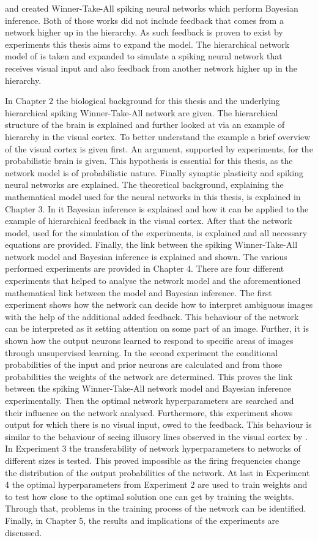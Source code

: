 \citet{nessler} and \citet{nesslerClone} created Winner-Take-All spiking neural networks which perform Bayesian inference. Both of those works did not include feedback that comes from a network higher up in the hierarchy. As such feedback is proven to exist by experiments this thesis aims to expand the model. The hierarchical network model of \citet{nessler} is taken and expanded to simulate a spiking neural network that receives visual input and also feedback from another network higher up in the hierarchy.

In Chapter 2 the biological background for this thesis and the underlying hierarchical spiking Winner-Take-All network are given. The hierarchical structure of the brain is explained and further looked at via an example of hierarchy in the visual cortex. To better understand the example a brief overview of the visual cortex is given first. An argument, supported by experiments, for the probabilistic brain is given. This hypothesis is essential for this thesis, as the network model is of probabilistic nature. Finally synaptic plasticity and spiking neural networks are explained.
The theoretical background, explaining the mathematical model used for the neural networks in this thesis, is explained in Chapter 3. In it Bayesian inference is  explained and how it can be applied to the example of hierarchical feedback in the visual cortex. After that the network model, used for the simulation of the experiments, is explained and all necessary equations are provided. Finally, the link between the spiking Winner-Take-All network model and Bayesian inference is  explained and shown.
The various performed experiments are provided in Chapter 4. There are four different experiments that helped to analyse the network model and the aforementioned mathematical link between the model and Bayesian inference. The first experiment shows how the network can decide how to interpret ambiguous images with the help of the additional added feedback. This behaviour of the network can be interpreted as it setting attention on some part of an image. Further, it is shown how the output neurons learned to respond to specific areas of images through unsupervised learning. In the second experiment the conditional probabilities of the input and prior neurons are calculated and from those probabilities the weights of the network are determined. This proves the link between the spiking Winner-Take-All network model and Bayesian inference experimentally. Then the optimal network hyperparameters are searched and their influence on the network analysed. Furthermore, this experiment shows output for which there is no visual input, owed to the feedback. This behaviour is similar to the behaviour of seeing illusory lines observed in the visual cortex by \citet{HierachicalBayesVisualCortex}. In Experiment 3 the transferability of network hyperparameters to networks of different sizes is tested. This proved impossible as the firing frequencies change the distribution of the output probabilities of the network. At last in Experiment 4 the optimal hyperparameters from Experiment 2 are used to train weights and to test how close to the optimal solution one can get by training the weights. Through that, problems in the training process of the network can be identified.
Finally, in Chapter 5, the results and implications of the experiments are discussed.